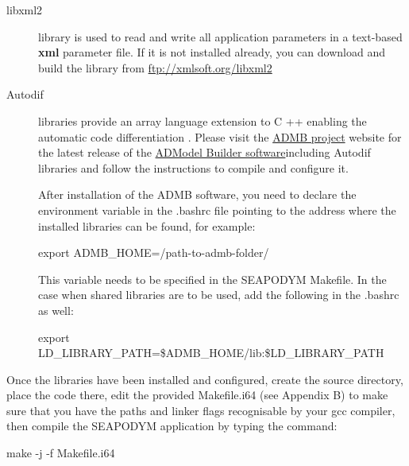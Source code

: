 \begin{description}

\item[libxml2] library is used to read and write all application parameters in a text-based {\bfseries xml} parameter file. If it is not installed already, you can download and build the library from 
  \url{ftp://xmlsoft.org/libxml2}

\item[Autodif] libraries provide an array language extension to C ++ enabling the automatic code differentiation \citep{Autodif}. Please visit the \href{www.admb-project.org}{ADMB project} website for the latest release of the \href{http://code.google.com/p/admb-project/downloads/list}{ADModel Builder software}\footnotemark[1] including Autodif libraries and follow the instructions to compile and configure it. 
  
   
After installation of the ADMB software, you need to declare the environment variable in the .bashrc file pointing to the address where the installed libraries can be found, for example:

\vspace{0.5cm}

{\ttfamily export ADMB\_HOME=/path-to-admb-folder/ }

\vspace{0.5cm}

This variable needs to be specified in the SEAPODYM Makefile. In the case when shared libraries are to be used, add the following in the .bashrc as well:

\vspace{0.5cm}
{\ttfamily export LD\_LIBRARY\_PATH=\$ADMB\_HOME/lib:\$LD\_LIBRARY\_PATH }
\vspace{0.5cm}
 
\end{description}

Once the libraries have been installed and configured, create the source directory, place the code there, edit the provided Makefile.i64 (see Appendix B) to make sure that you have the paths and linker flags recognisable by your gcc compiler, then compile the SEAPODYM application by typing the command:

\vspace{0.5cm}

{\ttfamily make -j -f Makefile.i64} \footnotemark[2]

